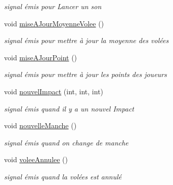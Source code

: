 \begin{DoxyCompactItemize}
\begin{DoxyCompactList}\small\item\em signal émis pour Lancer un son \end{DoxyCompactList}\item 
void \hyperlink{class_darts_a70c1ccef5cb7e47bff1384041ad9a596}{mise\+A\+Jour\+Moyenne\+Volee} ()
\begin{DoxyCompactList}\small\item\em signal émis pour mettre à jour la moyenne des volées \end{DoxyCompactList}\item 
void \hyperlink{class_darts_a455fa1efac223393aff2afbd33352569}{mise\+A\+Jour\+Point} ()
\begin{DoxyCompactList}\small\item\em signal émis pour mettre à jour les points des joueurs \end{DoxyCompactList}\item 
void \hyperlink{class_darts_aae5288e0c0f09a9837bcb7a517ede5af}{nouvel\+Impact} (int, int, int)
\begin{DoxyCompactList}\small\item\em signal émis quand il y a un nouvel Impact \end{DoxyCompactList}\item 
void \hyperlink{class_darts_ace3f99f5381399b0b86e5b8192d6fd71}{nouvelle\+Manche} ()
\begin{DoxyCompactList}\small\item\em signal émis quand on change de manche \end{DoxyCompactList}\item 
void \hyperlink{class_darts_a78f609ea9e8867459804bad777ce39f3}{volee\+Annulee} ()
\begin{DoxyCompactList}\small\item\em signal émis quand la volées est annulé \end{DoxyCompactList}\end{DoxyCompactItemize}
